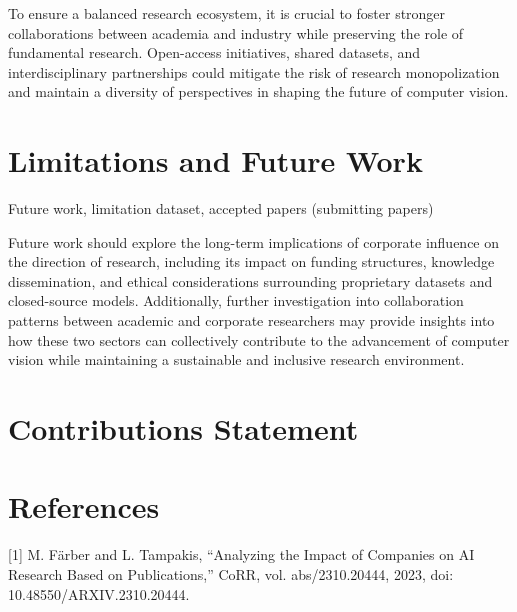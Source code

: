 \documentclass{article}
\begin{document}
To ensure a balanced research ecosystem, it is crucial to foster stronger collaborations between academia and industry while preserving the role of fundamental research. Open-access initiatives, shared datasets, and interdisciplinary partnerships could mitigate the risk of research monopolization and maintain a diversity of perspectives in shaping the future of computer vision. 

\section{Limitations and Future Work}
Future work, limitation dataset, accepted papers (submitting papers)

Future work should explore the long-term implications of corporate influence on the direction of research, including its impact on funding structures, knowledge dissemination, and ethical considerations surrounding proprietary datasets and closed-source models. Additionally, further investigation into collaboration patterns between academic and corporate researchers may provide insights into how these two sectors can collectively contribute to the advancement of computer vision while maintaining a sustainable and inclusive research environment.


\section{Contributions Statement}



\section*{References}

[1] M. Färber and L. Tampakis, “Analyzing the Impact of Companies on AI Research Based on Publications,” CoRR, vol. abs/2310.20444, 2023, doi: 10.48550/ARXIV.2310.20444.
\end{document}
